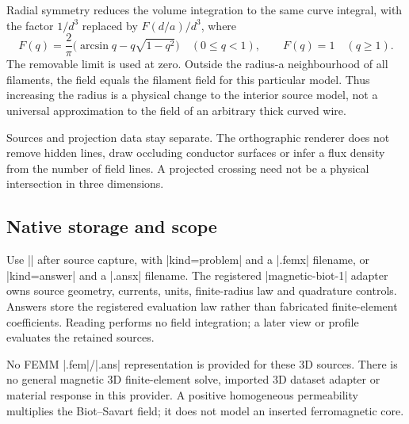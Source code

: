 Radial symmetry reduces the volume integration to the same curve integral,
with the factor $1/d^3$ replaced by $F(d/a)/d^3$, where
\[
 F(q)=\frac2\pi\bigl(\arcsin q-q\sqrt{1-q^2}\bigr)\quad(0\leq q<1),
 \qquad F(q)=1\quad(q\geq1).
\]
The removable limit is used at zero. Outside the radius-a neighbourhood of all
filaments, the field equals the filament field for this particular model.
Thus increasing the radius is a physical change to the interior source model,
not a universal approximation to the field of an arbitrary thick curved wire.

Sources and projection data stay separate. The orthographic renderer does not
remove hidden lines, draw occluding conductor surfaces or infer a flux density
from the number of field lines. A projected crossing need not be a physical
intersection in three dimensions.

\subsection{Native storage and scope}
Use |\femmsave| after source capture, with |kind=problem| and a |.femx| filename,
or |kind=answer| and a |.ansx| filename. The registered
|magnetic-biot-1| adapter owns source geometry, currents, units, finite-radius
law and quadrature controls. Answers store the registered evaluation law rather
than fabricated finite-element coefficients. Reading performs no field
integration; a later view or profile evaluates the retained sources.

No FEMM |.fem|/|.ans| representation is provided for these 3D sources. There is
no general magnetic 3D finite-element solve, imported 3D dataset adapter or
material response in this provider. A positive homogeneous permeability
multiplies the Biot--Savart field; it does not model an inserted ferromagnetic core.

\begin{codeexample}[width=0pt]
\qquad
{}
\end{codeexample}
